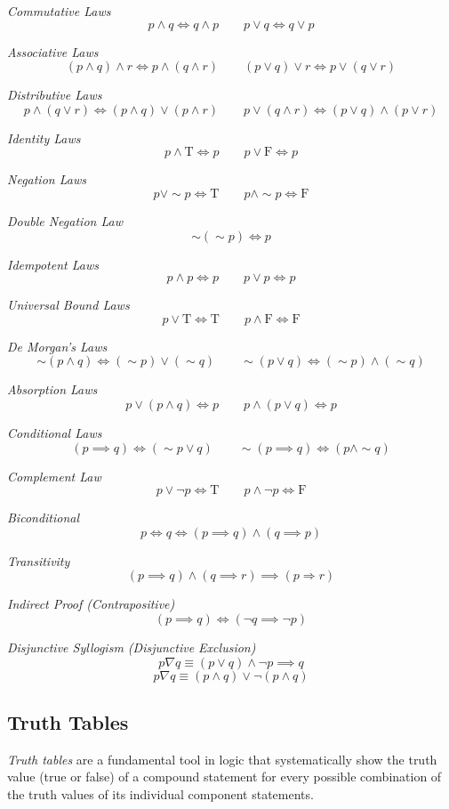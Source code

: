 \emph{Commutative Laws}
\[
	p \land q \iff q \land p \qquad p \lor q \iff q \lor p
\]

\emph{Associative Laws}
\[
	(p \land q) \land r \iff p \land (q \land r) \qquad (p \lor q) \lor r \iff p \lor (q \lor r)
\]

\emph{Distributive Laws}
\[
	p \land (q \lor r) \iff (p \land q) \lor (p \land r) \qquad
	p \lor (q \land r) \iff (p \lor q) \land (p \lor r)
\]

\emph{Identity Laws}
\[
	p \land \text{T} \iff p \qquad p \lor \text{F} \iff p
\]

\emph{Negation Laws}
\[
	p \lor \sim p \iff \text{T} \qquad p \land \sim p \iff \text{F}
\]

\emph{Double Negation Law}
\[
	\sim(\sim p) \iff p
\]

\emph{Idempotent Laws}
\[
	p \land p \iff p \qquad p \lor p \iff p
\]

\emph{Universal Bound Laws}
\[
	p \lor \text{T} \iff \text{T} \qquad p \land \text{F} \iff \text{F}
\]

\emph{De Morgan’s Laws}
\[
	\sim (p \land q) \iff (\sim p) \lor (\sim q) \qquad
	\sim (p \lor q) \iff (\sim p) \land (\sim q)
\]

\emph{Absorption Laws}
\[
	p \lor (p \land q) \iff p \qquad p \land (p \lor q) \iff p
\]

\emph{Conditional Laws}
\[
	(p \implies q) \iff (\sim p \lor q) \qquad \sim(p \implies q) \iff (p \land \sim q)
\]

\emph{Complement Law}
\[
	p \lor \neg p \iff \text{T} \qquad p \land \neg p \iff \text{F}
\]

\emph{Biconditional}
\[
	p \iff q \iff (p \implies q) \land (q \implies p)
\]

\emph{Transitivity}
\[
	(p \implies q) \land (q \implies r) \implies (p \Rightarrow r)
\]

\emph{Indirect Proof (Contrapositive)}
\[
	(p \implies q) \iff (\neg q \implies \neg p)
\]

\emph{Disjunctive Syllogism (Disjunctive Exclusion)}
\[
	p \nabla q \equiv (p \lor q) \land \neg p \implies q
\]
\[
	p \nabla q \equiv(p \land q) \lor \neg  (p \land q)
\]

\subsection{Truth Tables}

\emph{Truth tables} are a fundamental tool in logic that systematically show the truth value
(true or false) of a compound statement for every possible combination of the truth values of 
its individual component statements.
\vspace{\baselineskip}


